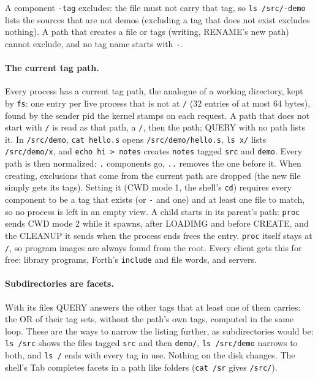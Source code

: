 A component \texttt{-tag} excludes: the file must not carry that tag, so \texttt{ls /src/-demo} lists
the sources that are not demos (excluding a tag that does not exist excludes nothing). A path that
creates a file or tags (writing, RENAME's new path) cannot exclude, and no tag name starts with
\texttt{-}.

\paragraph{The current tag path.}\label{sec:os-cwd} Every process has a current tag path, the
analogue of a working directory, kept by \texttt{fs}: one entry per live process that is not at
\texttt{/} (32 entries of at most 64 bytes), found by the sender pid the kernel stamps on each
request. A path that does not start with \texttt{/} is read as that path, a \texttt{/}, then the
path; QUERY with no path lists it. In \texttt{/src/demo}, \texttt{cat hello.s} opens
\texttt{/src/demo/hello.s}, \texttt{ls x/} lists \texttt{/src/demo/x}, and \texttt{echo hi > notes}
creates \texttt{notes} tagged \texttt{src} and \texttt{demo}. Every path is then normalized:
\texttt{.} components go, \texttt{..} removes the one before it. When creating, exclusions that come
from the current path are dropped (the new file simply gets its tags). Setting it (CWD mode 1, the
shell's \texttt{cd}) requires every component to be a tag that exists (or \texttt{-} and one) and
at least one file to match, so no process is left in an empty view. A child starts in its parent's
path: \texttt{proc} sends CWD mode 2 while it spawns, after LOADIMG and before CREATE, and the
CLEANUP it sends when the process ends frees the entry. \texttt{proc} itself stays at \texttt{/}, so
program images are always found from the root. Every client gets this for free: library programs,
Forth's \texttt{include} and file words, and servers.

\paragraph{Subdirectories are facets.} With its files QUERY answers the other tags that at least one of
them carries: the OR of their tag sets, without the path's own tags, computed in the same loop. These
are the ways to narrow the listing further, as subdirectories would be: \texttt{ls /src} shows the
files tagged \texttt{src} and then \texttt{demo/}, \texttt{ls /src/demo} narrows to both, and
\texttt{ls /} ends with every tag in use. Nothing on the disk changes. The shell's Tab completes facets
in a path like folders (\texttt{cat /sr} gives \texttt{/src/}).

